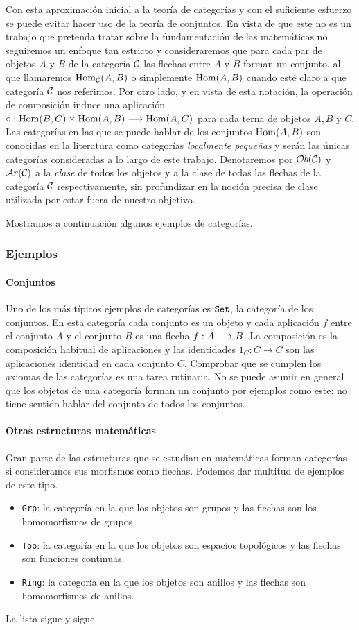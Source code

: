 Con esta aproximación inicial a la teoría de categorías y con el
suficiente esfuerzo se puede evitar hacer uso de la teoría de conjuntos.
En vista de que este no es un trabajo que pretenda tratar sobre la
fundamentación de las matemáticas no seguiremos un enfoque tan estricto
y consideraremos que para cada par de objetos $A$ y $B$ de la categoría
$\mathcal{C}$ las flechas entre $A$ y $B$ forman un conjunto, al que llamaremos
$\operatorname{Hom}_{\mathcal{C}}(A, B)$ o simplemente $\operatorname{Hom}(A, B)$ cuando esté claro a que
categoría $\mathcal{C}$ nos referimos. Por otro lado, y en vista de
esta notación, la operación de composición induce una aplicación
$\circ : \operatorname{Hom}(B, C) \times \operatorname{Hom}(A, B)\longrightarrow \operatorname{Hom}(A, C)$ para cada
terna de objetos $A, B$ y $C$. Las categorías en las que se puede
hablar de los conjuntos $\operatorname{Hom}(A, B)$ son conocidas en la literatura
como categorías \emph{localmente pequeñas} y serán las únicas
categorías consideradas a lo largo de este trabajo. Denotaremos por
$\mathcal{O}b(\mathcal{C})$ y $\mathcal{A}r(\mathcal{C})$ a la \emph{clase} de todos los objetos
y a la clase de todas las flechas de la categoría $\mathcal{C}$ respectivamente,
sin profundizar
en la noción precisa de clase utilizada por estar fuera
de nuestro objetivo.

Mostramos a continuación algunos ejemplos de categorías.

\subsubsection{Ejemplos}
\paragraph{Conjuntos}
Uno de los más típicos ejemplos de categorías es $\texttt{Set}$,
la categoría de los conjuntos. En esta categoría
cada conjunto es un objeto y cada
aplicación $f$ entre el conjunto $A$ y
el conjunto $B$ es una flecha $f : A\longrightarrow B$. La composición
es la composición habitual de aplicaciones y las identidades
$1_C : C \longrightarrow C$ son las aplicaciones identidad en
cada conjunto $C$.
Comprobar que se cumplen los axiomas de las categorías es una tarea
rutinaria. No se puede asumir en general que los
objetos de una categoría
forman un conjunto por ejemplos como este:
no tiene sentido hablar del conjunto de todos los conjuntos.

\paragraph{Otras estructuras matemáticas}
Gran parte de las estructuras que se estudian en matemáticas forman
categorías si consideramos sus morfismos como flechas.
Podemos dar multitud de ejemplos de este tipo.
\begin{itemize}
\item \texttt{Grp}: la categoría en la que los objetos son grupos
  y las flechas son los homomorfismos de grupos.
\item \texttt{Top}: la categoría en la que los objetos son espacios
  topológicos y las flechas son funciones continuas.
\item \texttt{Ring}: la categoría en la que los objetos son
  anillos y las flechas son homomorfismos de anillos.
\end{itemize}
La lista sigue y sigue.
